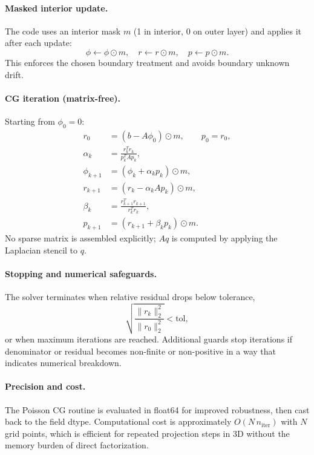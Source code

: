 \documentclass[11pt]{article}
\begin{document}
\paragraph{Masked interior update.}
The code uses an interior mask $m$ (1 in interior, 0 on outer layer) and applies it after each update:
\begin{equation}
\phi \leftarrow \phi \odot m,\quad r \leftarrow r \odot m,\quad p \leftarrow p \odot m.
\end{equation}
This enforces the chosen boundary treatment and avoids boundary unknown drift.

\paragraph{CG iteration (matrix-free).}
Starting from $\phi_0=0$:
\begin{align}
r_0 &= (b-A\phi_0)\odot m, \qquad p_0=r_0,\\
\alpha_k &= \frac{r_k^T r_k}{p_k^T A p_k},\\
\phi_{k+1} &= (\phi_k + \alpha_k p_k)\odot m,\\
r_{k+1} &= (r_k - \alpha_k A p_k)\odot m,\\
\beta_k &= \frac{r_{k+1}^T r_{k+1}}{r_k^T r_k},\\
p_{k+1} &= (r_{k+1} + \beta_k p_k)\odot m.
\end{align}
No sparse matrix is assembled explicitly; $Aq$ is computed by applying the Laplacian stencil to $q$.

\paragraph{Stopping and numerical safeguards.}
The solver terminates when relative residual drops below tolerance,
\begin{equation}
\sqrt{\frac{\|r_k\|_2^2}{\|r_0\|_2^2}} < \text{tol},
\end{equation}
or when maximum iterations are reached. Additional guards stop iterations if denominator or residual becomes non-finite or non-positive in a way that indicates numerical breakdown.

\paragraph{Precision and cost.}
The Poisson CG routine is evaluated in float64 for improved robustness, then cast back to the field dtype. Computational cost is approximately $O(N\,n_{\mathrm{iter}})$ with $N$ grid points, which is efficient for repeated projection steps in 3D without the memory burden of direct factorization.
\end{document}
